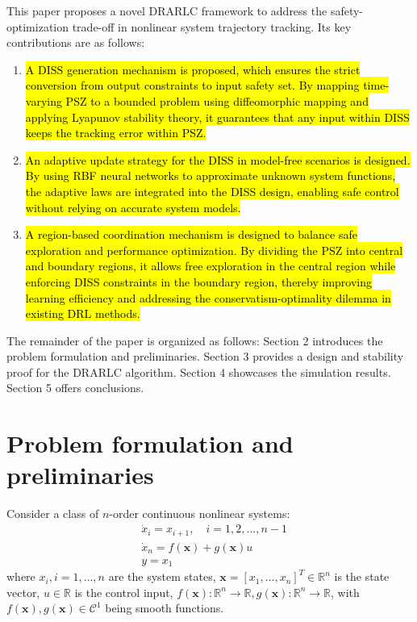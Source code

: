 \documentclass[preprint,12pt]{elsarticle}
\begin{document}
This paper proposes a novel DRARLC framework to address the safety-optimization trade-off in nonlinear system trajectory tracking. Its key contributions are as follows:

\begin{enumerate}
    \item \hl{A DISS generation mechanism is proposed, which ensures the strict conversion from output constraints to input safety set. By mapping time-varying PSZ to a bounded problem using diffeomorphic mapping and applying Lyapunov stability theory, it guarantees that any input within DISS keeps the tracking error within PSZ.}
    \item \hl{An adaptive update strategy for the DISS in model-free scenarios is designed. By using RBF neural networks to approximate unknown system functions, the adaptive laws are integrated into the DISS design, enabling safe control without relying on accurate system models.}
    \item \hl{A region-based coordination mechanism is designed to balance safe exploration and performance optimization. By dividing the PSZ into central and boundary regions, it allows free exploration in the central region while enforcing DISS constraints in the boundary region, thereby improving learning efficiency and addressing the conservatism-optimality dilemma in existing DRL methods.}
\end{enumerate}

The remainder of the paper is organized as follows: Section 2 introduces the problem formulation and preliminaries. Section 3  provides a design and stability proof for the DRARLC algorithm. Section 4 showcases the simulation results. Section 5 offers conclusions.

\section{Problem formulation and preliminaries}

Consider a class of $n$-order continuous nonlinear systems\hl{\cite{8989956}}:
\begin{equation}
    \begin{aligned}
      & \dot{x}_i = x_{i+1}, \quad i = 1,2,\dots,n-1 \\
      & \dot{x}_n = f(\mathbf{x}) + g(\mathbf{x})u \\
      & y = x_1 
    \end{aligned}\label{eq:system}
\end{equation}
where $x_i,i=1,\dots,n$ are the system states, $\mathbf{x} = [x_1,\dots,x_n]^T \in \mathbb{R}^n$ is the state vector, $u \in \mathbb{R}$ is the control input, $f(\mathbf{x}):\mathbb{R}^n \to\mathbb{R},g(\mathbf{x}):\mathbb{R}^n \to\mathbb{R}$, with $f(\mathbf{x}), g(\mathbf{x}) \in \mathcal{C}^1$ being smooth functions.
\end{document}
